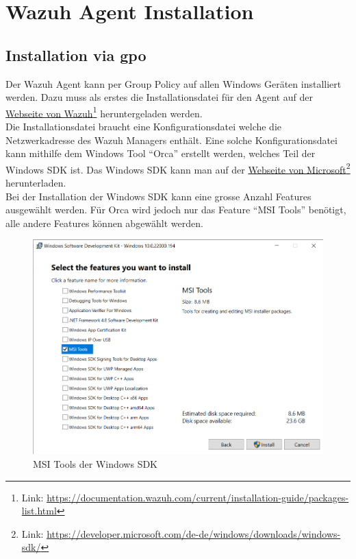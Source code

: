 \chapter{Wazuh Agent Installation}

\section{Installation via \acrshort{gpo}}
Der Wazuh Agent kann per Group Policy auf allen Windows Geräten installiert werden.
Dazu muss als erstes die Installationsdatei für den Agent auf der \href{https://documentation.wazuh.com/current/installation-guide/packages-list.html}{Webseite von Wazuh}\footnote{Link: \href{https://documentation.wazuh.com/current/installation-guide/packages-list.html}{https://documentation.wazuh.com/current/installation-guide/packages-list.html}} heruntergeladen werden.\\

Die Installationsdatei braucht eine Konfigurationsdatei welche die Netzwerkadresse des Wazuh Managers enthält.
Eine solche Konfigurationsdatei kann mithilfe dem Windows Tool ``Orca'' erstellt werden, welches Teil der Windows SDK ist. Das Windows SDK kann man auf der \href{https://developer.microsoft.com/de-de/windows/downloads/windows-sdk/}{Webseite von Microsoft}\footnote{Link: \href{https://developer.microsoft.com/de-de/windows/downloads/windows-sdk/}{https://developer.microsoft.com/de-de/windows/downloads/windows-sdk/}} herunterladen.\\

Bei der Installation der Windows SDK kann eine grosse Anzahl Features ausgewählt werden.
Für Orca wird jedoch nur das Feature ``MSI Tools'' benötigt, alle andere Features können abgewählt werden.
\begin{figure}[H]
    \centering
    \includegraphics[width=\linewidth]{../img/agent/install-sdk.png}
    \caption{MSI Tools der Windows SDK}
\end{figure}

